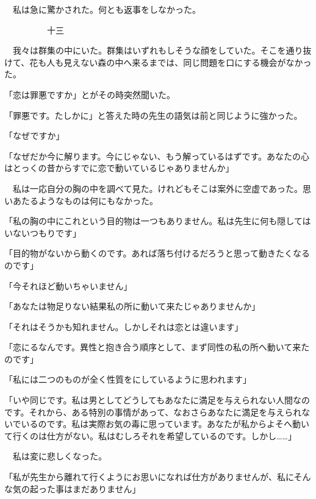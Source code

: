 \documentclass[a4j,onecolumn]{tarticle}
\begin{document}
　私は急に驚かされた。\hbox{}何とも返事をしなかった。\hbox{}\par{}\par{}　　　　　十三
\par{}
　我々は群集の中にいた。\hbox{}群集はいずれもしそうな顔をしていた。\hbox{}そこを通り抜けて、\hbox{}花も人も見えない森の中へ来るまでは、\hbox{}同じ問題を口にする機会がなかった。\hbox{}\par{}
「恋は罪悪ですか」とがその時突然聞いた。\hbox{}\par{}
「罪悪です。\hbox{}たしかに」と答えた時の先生の語気は前と同じように強かった。\hbox{}\par{}
「なぜですか」\par{}
「なぜだか今に解ります。\hbox{}今にじゃない、\hbox{}もう解っているはずです。\hbox{}あなたの心はとっくの昔からすでに恋で動いているじゃありませんか」\par{}
　私は一応自分の胸の中を調べて見た。\hbox{}けれどもそこは案外に空虚であった。\hbox{}思いあたるようなものは何にもなかった。\hbox{}\par{}
「私の胸の中にこれという目的物は一つもありません。\hbox{}私は先生に何も隠してはいないつもりです」\par{}
「目的物がないから動くのです。\hbox{}あれば落ち付けるだろうと思って動きたくなるのです」\par{}
「今それほど動いちゃいません」\par{}
「あなたは物足りない結果私の所に動いて来たじゃありませんか」\par{}
「それはそうかも知れません。\hbox{}しかしそれは恋とは違います」\par{}
「恋にるなんです。\hbox{}異性と抱き合う順序として、\hbox{}まず同性の私の所へ動いて来たのです」\par{}
「私には二つのものが全く性質をにしているように思われます」\par{}
「いや同じです。\hbox{}私は男としてどうしてもあなたに満足を与えられない人間なのです。\hbox{}それから、\hbox{}ある特別の事情があって、\hbox{}なおさらあなたに満足を与えられないでいるのです。\hbox{}私は実際お気の毒に思っています。\hbox{}あなたが私からよそへ動いて行くのは仕方がない。\hbox{}私はむしろそれを希望しているのです。\hbox{}しかし……」\par{}
　私は変に悲しくなった。\hbox{}\par{}
「私が先生から離れて行くようにお思いになれば仕方がありませんが、\hbox{}私にそんな気の起った事はまだありません」\par{}
\end{document}

